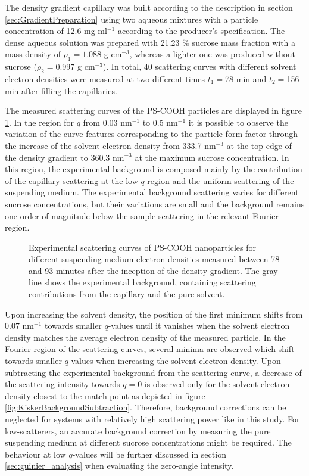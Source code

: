 The density gradient capillary was built according to the description in section \ref{sec:GradientPreparation} using two aqueous mixtures with a particle concentration of 12.6 mg ml$^{-1}$ according to the producer's specification. The dense aqueous solution was prepared with 21.23 $\%$ sucrose mass fraction with a mass density of \(\rho_1=1.088 \) g cm$^{-3}$, whereas a lighter one was produced without sucrose (\(\rho_2=0.997 \) g cm$^{-3}$). In total, 40 scattering curves with different solvent electron densities were measured at two different times \(t_1=\)78 min and \(t_2=\)156 min after filling the capillaries.

The measured scattering curves of the PS-COOH particles are displayed in figure \ref{fig:KiskerContinuousSAXS}. In the region for \(q\) from 0.03 nm\(^{-1}\) to 0.5 nm\(^{-1}\) it is possible to observe the variation of the curve features corresponding to the particle form factor through the increase of the solvent electron density from 333.7 nm\(^{-3}\) at the top edge of the density gradient to 360.3 nm\(^{-3}\) at the maximum sucrose concentration. In this region, the experimental background is composed mainly by the contribution of the capillary scattering at the low $q$-region and the uniform scattering of the suspending medium. The experimental background scattering varies for different sucrose concentrations, but their variations are small and the background remains one order of magnitude below the sample scattering in the relevant Fourier region.

\begin{figure}%
	\centering
		
		\caption[Experimental scattering curves of PS-COOH particles for different suspending medium electron densities.]{Experimental scattering curves of PS-COOH nanoparticles for different suspending medium electron densities measured between 78 and 93 minutes after the inception of the density gradient. The gray line shows the experimental background, containing scattering contributions from the capillary and the pure solvent.}
		\label{fig:KiskerContinuousSAXS}
\end{figure}

Upon increasing the solvent density, the position of the first minimum shifts from 0.07 nm\(^{-1}\) towards smaller \(q\)-values until it vanishes when the solvent electron density matches the average electron density of the measured particle. In the Fourier region of the scattering curves, several minima are observed which shift towards smaller \(q\)-values when increasing the solvent electron density. Upon subtracting the experimental background from the scattering curve, a decrease of the scattering intensity towards $q=0$ is observed only for the solvent electron density closest to the match point as depicted in figure \ref{fig:KiskerBackgroundSubtraction}. Therefore, background corrections can be neglected for systems with relatively high scattering power like in this study. For low-scatterers, an accurate background correction by measuring the pure suspending medium at different sucrose concentrations might be required. The behaviour at low $q$-values will be further discussed in section \ref{sec:guinier_analysis} when evaluating the zero-angle intensity.

